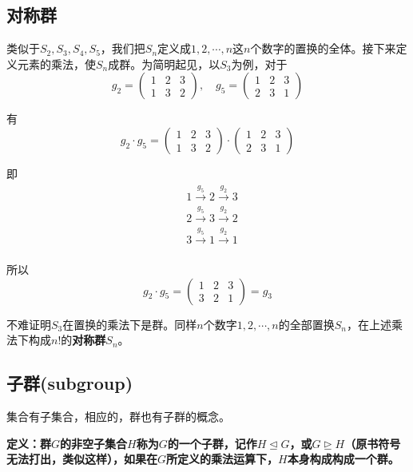 \documentclass[12pt]{article}
\begin{document}
\subsection{对称群}
类似于$S_2, S_3, S_4, S_5$，我们把$S_n$定义成$1, 2, \cdots, n$这$n$个数字的置换的全体。接下来定义元素的乘法，使$S_n$成群。为简明起见，以$S_3$为例，对于
$$
g_2 = \begin{pmatrix}
1 & 2 & 3\\1 & 3 & 2
\end{pmatrix}, \quad
g_5 = \begin{pmatrix}
1 & 2 & 3\\2 & 3 & 1
\end{pmatrix}
$$

有
$$
g_2 \cdot g_5 = \begin{pmatrix}
1 & 2 & 3\\1 & 3 & 2
\end{pmatrix} \cdot \begin{pmatrix}
1 & 2 & 3\\2 & 3 & 1
\end{pmatrix}
$$

即
\begin{align*}
  & 1 \xrightarrow{g_5} 2 \xrightarrow{g_2} 3  \\
  & 2 \xrightarrow{g_5} 3 \xrightarrow{g_2} 2  \\
  & 3 \xrightarrow{g_5} 1 \xrightarrow{g_2} 1  \\
\end{align*}

所以
$$
g_2 \cdot g_5 = \begin{pmatrix}
1 & 2 & 3\\3 & 2 & 1
\end{pmatrix} = g_3
$$

不难证明$S_3$在置换的乘法下是群。同样$n$个数字$1, 2, \cdots, n$的全部置换$S_n$，在上述乘法下构成$n!$的\textbf{对称群$S_n$}。

\subsection{子群(subgroup)}
集合有子集合，相应的，群也有子群的概念。
\begin{mdframed}[
linecolor=black!40,outerlinewidth=1pt,roundcorner=.5em,innertopmargin=1ex,innerbottommargin=.5\baselineskip,innerrightmargin=1em,innerleftmargin=1em,backgroundcolor=gray!5,
]
\textbf{
定义：群$G$的非空子集合$H$称为$G$的一个子群，记作$H \unlhd G$，或$G \unrhd H$（原书符号无法打出，类似这样），如果在$G$所定义的乘法运算下，$H$本身构成构成一个群。
}
\end{mdframed}
\end{document}

